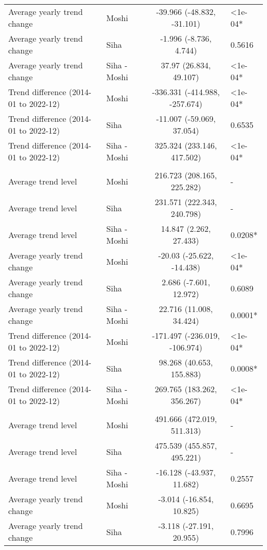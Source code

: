 \begin{longtable}{l|lcl}
Average yearly trend change & Moshi & -39.966 (-48.832, -31.101) & <1e-04* \\ 
Average yearly trend change & Siha & -1.996 (-8.736, 4.744) & 0.5616 \\ 
Average yearly trend change & Siha - Moshi & 37.97 (26.834, 49.107) & <1e-04* \\ 
Trend difference (2014-01 to 2022-12) & Moshi & -336.331 (-414.988, -257.674) & <1e-04* \\ 
Trend difference (2014-01 to 2022-12) & Siha & -11.007 (-59.069, 37.054) & 0.6535 \\ 
Trend difference (2014-01 to 2022-12) & Siha - Moshi & 325.324 (233.146, 417.502) & <1e-04* \\ 
\midrule\addlinespace[2.5pt]
\multicolumn{4}{l}{Other Communicable Diseases} \\ 
\midrule\addlinespace[2.5pt]
Average trend level & Moshi & 216.723 (208.165, 225.282) & - \\ 
Average trend level & Siha & 231.571 (222.343, 240.798) & - \\ 
Average trend level & Siha - Moshi & 14.847 (2.262, 27.433) & 0.0208* \\ 
Average yearly trend change & Moshi & -20.03 (-25.622, -14.438) & <1e-04* \\ 
Average yearly trend change & Siha & 2.686 (-7.601, 12.972) & 0.6089 \\ 
Average yearly trend change & Siha - Moshi & 22.716 (11.008, 34.424) & 0.0001* \\ 
Trend difference (2014-01 to 2022-12) & Moshi & -171.497 (-236.019, -106.974) & <1e-04* \\ 
Trend difference (2014-01 to 2022-12) & Siha & 98.268 (40.653, 155.883) & 0.0008* \\ 
Trend difference (2014-01 to 2022-12) & Siha - Moshi & 269.765 (183.262, 356.267) & <1e-04* \\ 
\midrule\addlinespace[2.5pt]
\multicolumn{4}{l}{Other Non-Communicable} \\ 
\midrule\addlinespace[2.5pt]
Average trend level & Moshi & 491.666 (472.019, 511.313) & - \\ 
Average trend level & Siha & 475.539 (455.857, 495.221) & - \\ 
Average trend level & Siha - Moshi & -16.128 (-43.937, 11.682) & 0.2557 \\ 
Average yearly trend change & Moshi & -3.014 (-16.854, 10.825) & 0.6695 \\ 
Average yearly trend change & Siha & -3.118 (-27.191, 20.955) & 0.7996 \\ 

\end{longtable}
